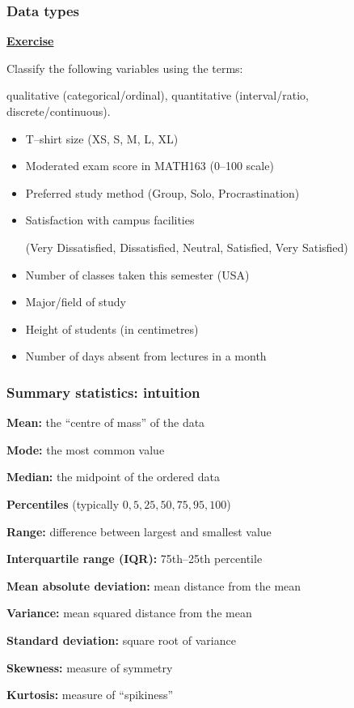 \documentclass[t,8pt]{beamer}
\begin{document}
	\begin{frame}
		\frametitle{Data types}
		{\bf\underline{Exercise}} \par
		Classify the following variables using the terms: \par
		qualitative (categorical/ordinal), quantitative (interval/ratio, discrete/continuous).
		\begin{itemize}
			\item T–shirt size (XS, S, M, L, XL)
			\item Moderated exam score in MATH163 (0–100 scale)
			\item Preferred study method (Group, Solo, Procrastination)
			\item Satisfaction with campus facilities \par
			(Very Dissatisfied, Dissatisfied, Neutral, Satisfied, Very Satisfied)
			\item Number of classes taken this semester (USA)
			\item Major/field of study
			\item Height of students (in centimetres)
			\item Number of days absent from lectures in a month
		\end{itemize}
	\end{frame}
	
	\begin{frame}
		\frametitle{Summary statistics: intuition}
		\begin{itemize}
			\item {\bf Mean:} the ``centre of mass'' of the data
			{\color{black!40}
				\item {\bf Mode:} the most common value
				\item {\bf Median:} the midpoint of the ordered data
				\item {\bf Percentiles} (typically $0,5,25,50,75,95,100$)
			}
			{\color{black!40}
				\item {\bf Range:} difference between largest and smallest value
				\item {\bf Interquartile range (IQR):} 75th–25th percentile
				\item {\bf Mean absolute deviation:} mean distance from the mean
			}
			\item {\bf Variance:} mean squared distance from the mean
			\item {\bf Standard deviation:} square root of variance
			{\color{black!40}
				\item {\bf Skewness:} measure of symmetry
				\item {\bf Kurtosis:} measure of ``spikiness''
			}
		\end{itemize}
	\end{frame}
	
\end{document}
